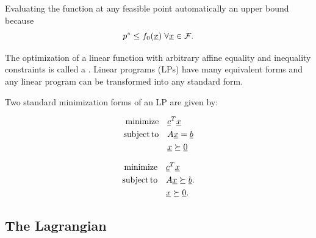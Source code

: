 Evaluating the function at any feasible point automatically an upper bound because
\[ p^* \leq f_0 (\underline{x}) \; \forall \underline{x}\in \mathcal{F}. \]

The optimization of a linear function with arbitrary affine equality and inequality constraints is called a .
Linear programs (LPs) have many equivalent forms and any linear program can be transformed into any standard form.

\begin{definition} \label{def:standard_lp}
Two standard minimization forms of an LP are given by:\\ \begin{minipage}{0.49\textwidth}
\vspace{-2mm}
\begin{align*}
\mathrm{minimize} \quad & \underline{c}^T \underline{x} \\
\mathrm{subject\,to} \quad & A \underline{x} = \underline{b} \\
& \underline{x} \succeq \underline{0}
\end{align*}
\end{minipage}
\begin{minipage}{0.49\textwidth}
\vspace{-2mm}
\begin{align*}
\mathrm{minimize} \quad & \underline{c}^T \underline{x} \\
\mathrm{subject\,to} \quad & A \underline{x} \succeq \underline{b}. \\
& \underline{x} \succeq \underline{0}.
\end{align*}
\end{minipage}
\end{definition}



\subsection{The Lagrangian}

